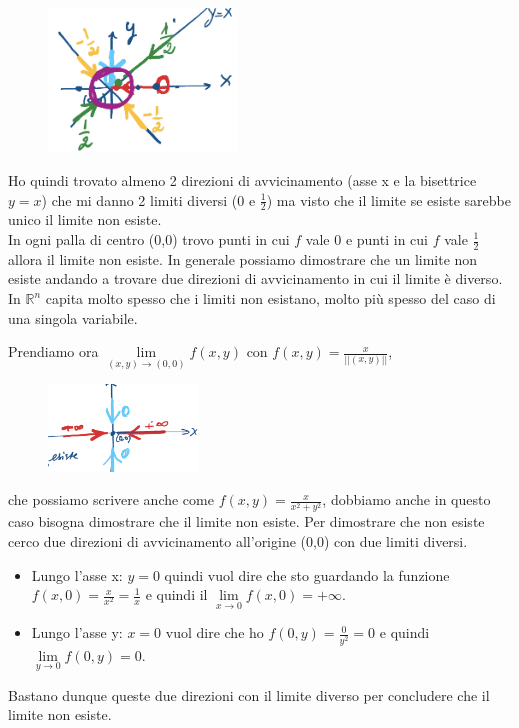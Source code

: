 \begin{figure}
\vspace{-20pt}
    \centering
    \includegraphics[width=5cm]{images/ess-lim-2var-asseX.png}
\end{figure}
Ho quindi trovato almeno 2 direzioni di avvicinamento (asse x e la bisettrice $y=x$) che mi danno 2 limiti diversi (0 e $\frac{1}{2}$) ma visto che il limite se esiste sarebbe unico il limite non esiste.\\
In ogni palla di centro (0,0) trovo punti in cui $f$ vale 0 e punti in cui $f$ vale $\frac{1}{2}$ allora il limite non esiste.
\hspace{-15pt}In generale possiamo dimostrare che un limite non esiste andando a trovare due direzioni di avvicinamento in cui il limite è diverso. In $\mathbb{R}^n$ capita molto spesso che i limiti non esistano, molto più spesso del caso di una singola variabile.

\begin{example}
Prendiamo ora $\lim\limits_{(x,y)\to (0,0)}f(x,y)$ con $f(x,y) = \frac{x}{||(x,y)||}$,
\end{example}
\begin{figure}
\vspace{-35pt}
    \centering
    \includegraphics[width=4cm]{images/ess-lim-2var-2.png}
\end{figure}
che possiamo scrivere anche come $f(x,y) = \frac{x}{x^2 + y^2}$, dobbiamo anche in questo caso bisogna dimostrare che il limite non esiste. Per dimostrare che non esiste cerco due direzioni di avvicinamento all'origine (0,0) con due limiti diversi.
\begin{itemize}
    \item Lungo l'asse x: $y = 0$ quindi vuol dire che sto guardando la funzione $f(x,0) = \frac{x}{x^2} = \frac{1}{x}$ e quindi il $\lim\limits_{x\to 0}f(x,0) = +\infty$.
    \item Lungo l'asse y: $x=0$ vuol dire che ho $f(0,y) = \frac{0}{y^2} = 0$ e quindi $\lim\limits_{y \to 0}f(0,y) = 0$.
\end{itemize}
Bastano dunque queste due direzioni con il limite diverso per concludere che il limite non esiste.


